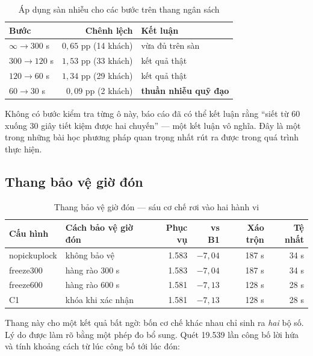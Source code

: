 \begin{table}[htbp]
\centering
\caption{Áp dụng sàn nhiễu cho các bước trên thang ngân sách}
\label{bang:sannhieu}
\small
\begin{tabular}{@{}lrl@{}}
\toprule
\textbf{Bước} & \textbf{Chênh lệch} & \textbf{Kết luận}\\
\midrule
$\infty \to 300$ s & $0{,}65$ pp (14 khách) & vừa đủ trên sàn\\
$300 \to 120$ s & $1{,}53$ pp (33 khách) & kết quả thật\\
$120 \to 60$ s & $1{,}34$ pp (29 khách) & kết quả thật\\
$60 \to 30$ s & $0{,}09$ pp (2 khách) & \textbf{thuần nhiễu quỹ đạo}\\
\bottomrule
\end{tabular}
\end{table}

Không có bước kiểm tra từng ô này, báo cáo đã có thể kết luận rằng ``siết từ 60 xuống 30 giây
tiết kiệm được hai chuyến'' --- một kết luận vô nghĩa. Đây là một trong những bài học phương
pháp quan trọng nhất rút ra được trong quá trình thực hiện.

\subsection{Thang bảo vệ giờ đón}

\begin{table}[htbp]
\centering
\caption{Thang bảo vệ giờ đón --- sáu cơ chế rơi vào hai hành vi}
\label{bang:thang2}
\small
\begin{tabular}{@{}llrrrr@{}}
\toprule
\textbf{Cấu hình} & \textbf{Cách bảo vệ giờ đón} & \textbf{Phục vụ} & \textbf{vs B1} & \textbf{Xáo trộn} & \textbf{Tệ nhất}\\
\midrule
nopickuplock & không bảo vệ & 1.583 & $-7{,}04$ & 187 s & 34 s\\
freeze300 & hàng rào 300 s & 1.583 & $-7{,}04$ & 187 s & 34 s\\
freeze600 & hàng rào 600 s & 1.581 & $-7{,}13$ & 128 s & 28 s\\
C1 & khóa khi xác nhận & 1.581 & $-7{,}13$ & 128 s & 28 s\\
\bottomrule
\end{tabular}
\end{table}

Thang này cho một kết quả bất ngờ: bốn cơ chế khác nhau chỉ sinh ra \emph{hai} bộ số. Lý do được
làm rõ bằng một phép đo bổ sung. Quét 19.539 lần công bố lời hứa và tính khoảng cách từ lúc công
bố tới lúc đón:

